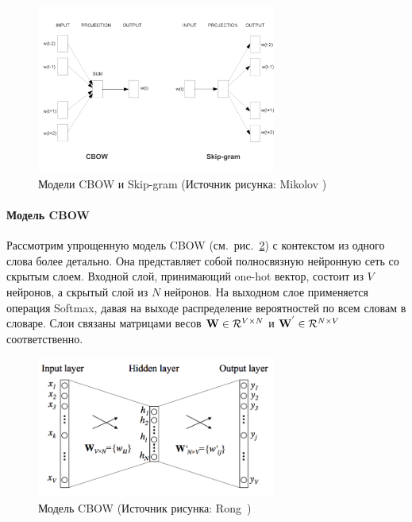 \begin{figure}[t]
\centering
\includegraphics[width=0.7\textwidth]{img/efficient-models}
\caption{\label{fig:w2v-models}Модели CBOW и Skip-gram (Источник рисунка: \hspace{\textwidth}Mikolov \autocite{DBLP:journals/corr/abs-1301-3781})}
\end{figure}

\paragraph{Модель CBOW} Рассмотрим упрощенную модель CBOW (см.~рис.~\ref{fig:w2v-cbow}) с контекстом из одного слова более детально. Она представляет собой полносвязную нейронную сеть со скрытым слоем. Входной слой, принимающий one-hot вектор, состоит из ${V}$ нейронов, а скрытый слой из ${N}$ нейронов. На выходном слое применяется операция Softmax, давая на выходе распределение вероятностей по всем словам в словаре. Слои связаны матрицами весов ${\textbf W} \in \mathcal{R}^{V \times N } $ и ${\textbf W^{'}} \in \mathcal{R}^{N \times V}$ соответственно.

\begin{figure}[ht]
\centering
\includegraphics[width=0.7\textwidth]{img/CBOW.png}
\caption{\label{fig:w2v-cbow}Модель CBOW (Источник рисунка: Rong~\autocite{Rong2014word2vecPL})}
\end{figure}


